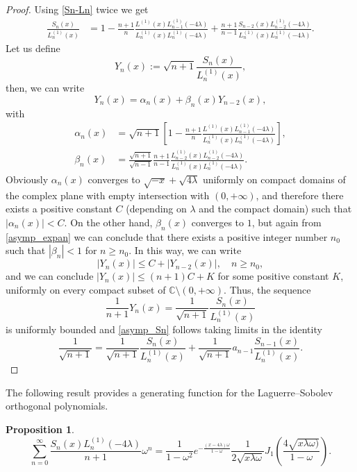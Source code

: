 \documentclass[reqno,10pt]{amsart}
\theoremstyle{plain}
\newtheorem{proposition}[theorem]{Proposition}
\numberwithin{equation}{section}
\numberwithin{figure}{section}
\begin{document}
\begin{proof}
Using \eqref{Sn-Ln} twice we get
\begin{align*}
\frac{S_{n}(x)}{L^{(1)}_{n}(x)}  &= 1 -\frac{n+1}{n}
\frac{L^{(1)}(x)L^{(1)}_{n-1}(-4\lambda)}{L_{n}^{(1)}(x)L^{(1)}_{n}(-4\lambda)}+ \frac{n+1}{n-1}\frac{S_{n-2}(x)L^{(1)}_{n-2}(-4\lambda)}{L_{n}^{(1)}(x)L^{(1)}_{n}(-4\lambda)}.
\end{align*}
Let us define 
$$
Y_n(x) := \sqrt{n+1} \frac{S_{n}(x)}{L^{(1)}_{n}(x)},
$$
then, we can write
$$
Y_n(x) = \alpha_n(x) + \beta_n(x) Y_{n-2}(x),
$$
with
\begin{align*}
\alpha_n(x) &= \sqrt{n+1}\left[1 -\frac{n+1}{n}
\frac{L^{(1)}(x)L^{(1)}_{n-1}(-4\lambda)}{L_{n}^{(1)}(x)L^{(1)}_{n}(-4\lambda)}\right],\\ 
\beta_n(x)& = \frac{\sqrt{n+1}}{\sqrt{n-1}}\frac{n+1}{n-1}\frac{L^{(1)}_{n-2}(x)L^{(1)}_{n-2}(-4\lambda)}{L_{n}^{(1)}(x)L^{(1)}_{n}(-4\lambda)}.
\end{align*}
Obviously $\alpha_n(x)$ converges to $\sqrt{-x}+\sqrt{4\lambda}$ uniformly on compact domains of 
the complex plane with empty intersection with $(0,+\infty)$, and therefore there exists a positive constant $C$ (depending on $\lambda$ and the compact domain) such that $|\alpha_n(x)| < C$. On the other hand, $\beta_n(x)$ converges to $1$, but again from \eqref{asymp_expan} we can conclude that there exists a positive integer number $n_0$ such that $|\beta_n| < 1$ for $n\geqslant n_0$. In this way, we can write
$$
|Y_n(x)| \leqslant C + |Y_{n-2}(x)|, \quad n\geqslant n_0,
$$
and we can conclude $|Y_n(x)| \leqslant (n+1) C + K$ for some positive constant $K$, uniformly on every compact subset of $\mathbb{C}\setminus(0,+\infty)$. Thus, the sequence
$$
\frac{1}{n+1}Y_n(x) = \frac{1}{\sqrt{n+1}} \frac{S_{n}(x)}{L^{(1)}_{n}(x)}
$$
is uniformly bounded and \eqref{asymp_Sn} follows taking limits in the identity
$$
\frac{1}{\sqrt{n+1}} = \frac{1}{\sqrt{n+1}} \frac{S_{n}(x)}{L^{(1)}_{n}(x)} +  \frac{1}{\sqrt{n+1}} a_{n-1}\frac{S_{n-1}(x)}{L^{(1)}_{n}(x)}.
$$
\end{proof}

\medskip

The following result provides a generating function for the Laguerre--Sobolev orthogonal polynomials.

\begin{proposition}
\begin{equation} \label{gen_fun}
\sum_{n=0}^{\infty} \frac{S_{n}(x)L^{(1)}_{n}(-4\lambda)}{n+1} \omega^n  =
\frac{1}{1-\omega^2} e^{- \frac{(x-4 \lambda)\omega}{1-\omega}} \frac{1}{2\sqrt{x\lambda\omega}} J_{1} \left(  \frac{4\sqrt{x\lambda\omega)}}{1-\omega}\right).
\end{equation}
\end{proposition}
\end{document}
